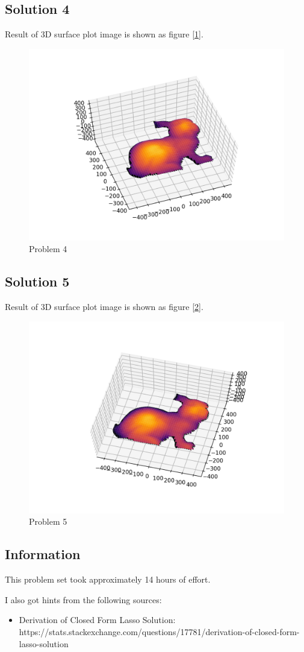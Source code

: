 \documentclass{article}
\newcommand{\info}{\clearpage \subsection*{Information}}
\newcommand{\solution}[1]{\clearpage \subsection*{Solution #1}}
\begin{document}
\solution{4}
Result of 3D surface plot image is shown as figure [\ref{fig:4}].
\begin{figure}[htbp]
  \centering 
  \includegraphics[width = .8\textwidth]{./code/outputs/prob4.png}
  \caption{Problem 4}
  \label{fig:4}
\end{figure} 

\solution{5}
Result of 3D surface plot image is shown as figure [\ref{fig:5}].
\begin{figure}[htbp]
  \centering 
  \includegraphics[width = .8\textwidth]{./code/outputs/prob5.png}
  \caption{Problem 5}
  \label{fig:5}
\end{figure} 

\info
 
This problem set took approximately 14 hours of effort.

I also got hints from the following sources:
\begin{itemize}
\item Derivation of Closed Form Lasso Solution: https://stats.stackexchange.com/questions/17781/derivation-of-closed-form-lasso-solution
\end{itemize}
\end{document}
